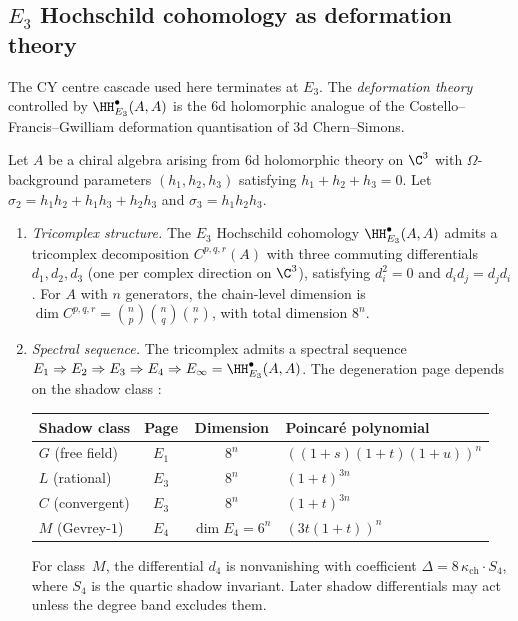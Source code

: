 \subsection{\texorpdfstring{$E_3$}{E-3} Hochschild cohomology as deformation theory}
\label{subsec:e3-hochschild-deformation-theory}

The CY centre cascade used here terminates at $E_3$. The \emph{deformation
theory} controlled by $\HH^\bullet_{E_3}(A, A)$ is the $6$d holomorphic
analogue of the Costello--Francis--Gwilliam deformation quantisation of
$3$d Chern--Simons.

\begin{conjecture}
\label{conj:e3-hochschild-deformation}
\ClaimStatusConjectured
Let $A$ be a chiral algebra arising from $6$d holomorphic theory on $\C^3$
with $\Omega$-background parameters $(h_1, h_2, h_3)$ satisfying
$h_1 + h_2 + h_3 = 0$. Let $\sigma_2 = h_1 h_2 + h_1 h_3 + h_2 h_3$
and $\sigma_3 = h_1 h_2 h_3$.
\begin{enumerate}[label=\textup{(\alph*)}]
 \item \emph{Tricomplex structure.}
 The $E_3$ Hochschild cohomology $\HH^\bullet_{E_3}(A, A)$ admits a
 tricomplex decomposition $C^{p,q,r}(A)$ with three commuting
 differentials $d_1, d_2, d_3$ (one per complex direction on $\C^3$),
 satisfying $d_i^2 = 0$ and $d_i d_j = d_j d_i$. For $A$ with $n$
 generators, the chain-level dimension is
 $\dim C^{p,q,r} = \binom{n}{p}\binom{n}{q}\binom{n}{r}$,
 with total dimension $8^n$.

 \item \emph{Spectral sequence.}
 The tricomplex admits a spectral sequence
 $E_1 \Rightarrow E_2 \Rightarrow E_3 \Rightarrow E_4 \Rightarrow E_\infty
 = \HH^\bullet_{E_3}(A, A)$.
 The degeneration page depends on the shadow class \textup{}:
 \begin{center}
 \small
 \renewcommand{\arraystretch}{1.15}
 \begin{tabular}{lccl}
 \toprule
 Shadow class & Page & Dimension & Poincar\'e polynomial \\
 \midrule
 $G$ \textup{(free field)} & $E_1$ & $8^n$ & $((1+s)(1+t)(1+u))^n$ \\
 $L$ \textup{(rational)} & $E_3$ & $8^n$ & $(1+t)^{3n}$ \\
 $C$ \textup{(convergent)} & $E_3$ & $8^n$ & $(1+t)^{3n}$ \\
 $M$ \textup{(Gevrey-$1$)} & $E_4$ & $\dim E_4=6^n$ & $(3t(1+t))^n$ \\
 \bottomrule
 \end{tabular}
 \end{center}
 For class~$M$, the differential $d_4$ is nonvanishing with coefficient
 $\Delta = 8\,\kappa_{\mathrm{ch}} \cdot S_4$, where $S_4$ is the quartic
 shadow invariant. Later shadow differentials may act unless the degree
 band excludes them.


\end{enumerate}
\end{conjecture}
